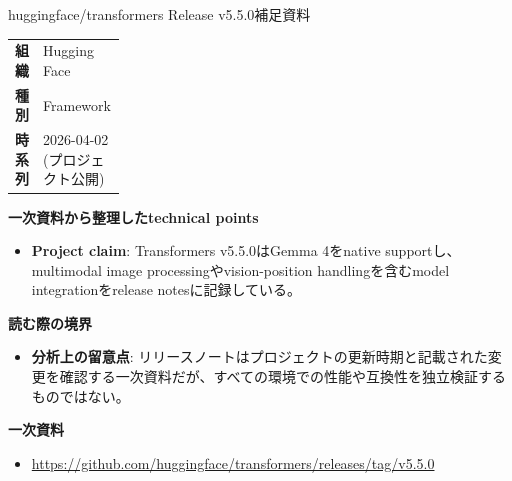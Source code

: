 \begin{technicalnote}{huggingface/transformers Release v5.5.0}{補足資料}
\begingroup
\begin{tabularx}{\linewidth}{@{}>{\bfseries}p{0.22\linewidth}X@{}}
組織 & Hugging Face \\
種別 & Framework \\
時系列 & 2026-04-02 (プロジェクト公開) \\
\end{tabularx}
\smallskip
{\bfseries 一次資料から整理したtechnical points}
\begin{itemize}[leftmargin=1.5em,itemsep=0.35em]
\item \textbf{Project claim}: Transformers v5.5.0はGemma 4をnative supportし、multimodal image processingやvision-position handlingを含むmodel integrationをrelease notesに記録している。
\end{itemize}
{\bfseries 読む際の境界}
\begin{itemize}[leftmargin=1.5em,itemsep=0.35em]
\item \textbf{分析上の留意点}: リリースノートはプロジェクトの更新時期と記載された変更を確認する一次資料だが、すべての環境での性能や互換性を独立検証するものではない。
\end{itemize}
\begin{samepage}
{\bfseries 一次資料}
\begingroup\sloppy
\begin{itemize}[leftmargin=1.5em,itemsep=0.25em]
\item {\scriptsize\url{https://github.com/huggingface/transformers/releases/tag/v5.5.0}}
\end{itemize}
\endgroup
\end{samepage}
\endgroup
\end{technicalnote}
\medskip
